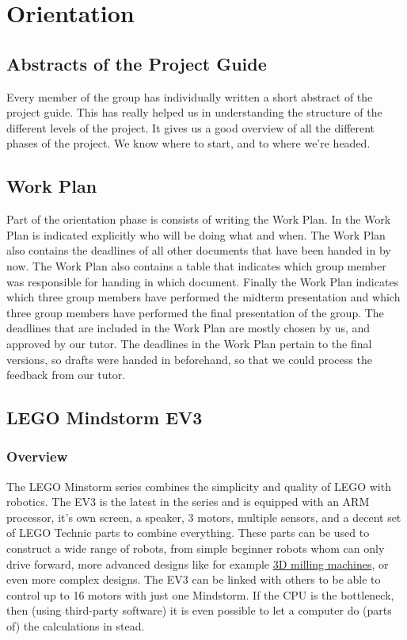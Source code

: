 \section{Orientation} \label{orientation:orientation}
\subsection{Abstracts of the Project Guide} \label{orientation:orientation:abstract}
Every member of the group has individually written a short abstract of the project guide. This has really helped us in understanding the structure of the different levels of the project. It gives us a good overview of all the different phases of the project. We know where to start, and to where we're headed. \newpage

\subsection{Work Plan} \label{orientation:orientation:work-plan}
Part of the orientation phase is consists of writing the Work Plan. In the Work Plan is indicated explicitly who will be doing what and when. The Work Plan also contains the deadlines of all other documents that have been handed in by now. The Work Plan also contains a table that indicates which group member was responsible for handing in which document. Finally the Work Plan indicates which three group members have performed the midterm presentation and which three group members have performed the final presentation of the group. The deadlines that are included in the Work Plan are mostly chosen by us, and approved by our tutor. The deadlines in the Work Plan pertain to the final versions, so drafts were handed in beforehand, so that we could process the feedback from our tutor.

\subsection{LEGO Mindstorm EV3} \label{orientation:ev3}
\subsubsection{Overview} \label{orientation:ev3:overview}
The LEGO Minstorm series combines the simplicity and quality of LEGO with robotics. The EV3 is the latest in the series and is equipped with an ARM processor, it's own screen, a speaker, 3 motors, multiple sensors, and a decent set of LEGO Technic parts to combine everything. These parts can be used to construct a wide range of robots, from simple beginner robots whom can only drive forward, more advanced designs like for example  \href{https://www.youtube.com/watch?v=pX1cO2XhMrg}{3D milling machines}, or even more complex designs. The EV3 can be linked with others to be able to control up to 16 motors with just one Mindstorm. If the CPU is the bottleneck, then (using third-party software) it is even possible to let a computer do (parts of) the calculations in stead.


